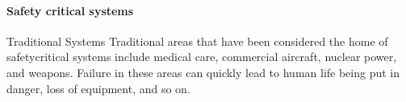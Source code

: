 %
%
%
%
%
%
%





\paragraph{Safety critical systems}

\cite{winceckCriticalToSafety}
\cite{chambersHazardAnalysisSCS}
\cite{rslater1998SCSAnalysis}
Traditional Systems
Traditional areas that have been considered the home of safetycritical systems include medical care, commercial aircraft, nuclear
power, and weapons. Failure in these areas can quickly lead to
human life being put in danger, loss of equipment, and so on.

